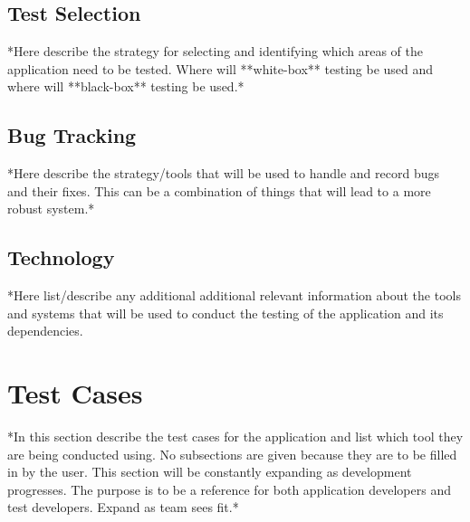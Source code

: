 \documentclass{article}
\begin{document}
\subsection{Test Selection} *Here describe the strategy for selecting and
identifying which areas of the application need to be tested. Where will
**white-box** testing be used and where will **black-box** testing be used.* 

\subsection{Bug Tracking} *Here describe the strategy/tools that will be used
to handle and record bugs and their fixes. This can be a combination of things
that will lead to a more robust system.*

\subsection{Technology} *Here list/describe any additional additional relevant
information about the tools and systems that will be used to conduct the
testing of the application and its dependencies.


\section{Test Cases} *In this section describe the test cases for the
application and list which tool they are being conducted using. No subsections
are given because they are to be filled in by the user. This section will be
constantly expanding as development progresses. The purpose is to be a
reference for both application developers and test developers. Expand as team
sees fit.*
\end{document}
